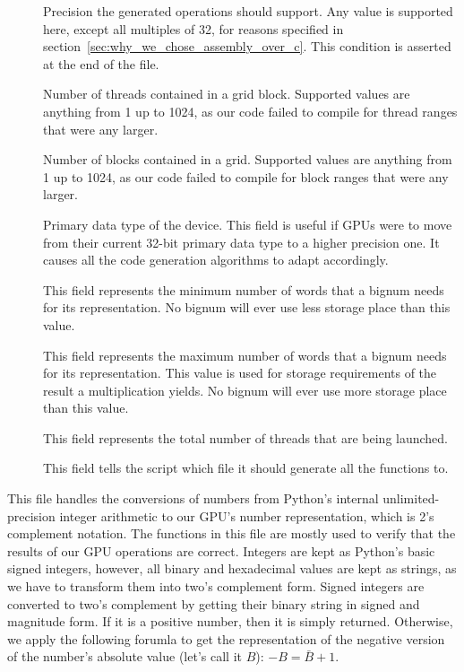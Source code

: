 \documentclass[10pt, a4paper]{report}
\begin{document}
\begin{description}
\begin{description}
\item[] Precision the generated operations should support.
Any value is supported here, except all multiples of 32, for reasons specified
in section~\ref{sec:why_we_chose_assembly_over_c}.
This condition is asserted at the end of the file.
\item[] Number of threads contained in a grid block.
Supported values are anything from 1 up to 1024, as our code failed to compile
for thread ranges that were any larger.
\item[] Number of blocks contained in a grid.
Supported values are anything from 1 up to 1024, as our code failed to compile
for block ranges that were any larger.
\item[] Primary data type of the device.
This field is useful if GPUs were to move from their current  32-bit primary
data type to a higher precision one.
It causes all the code generation algorithms to adapt accordingly.
\item[] This field represents the minimum number
of words that a bignum needs for its representation.
No bignum will ever use less storage place than this value.
\item[] This field represents the maximum number
of words that a bignum needs for its representation.
This value is used for storage requirements of the result a multiplication
yields.
No bignum will ever use more storage place than this value.
\item[] This field represents the total number of threads
that are being launched.
\item[] This field tells the script which file it
should generate all the functions to.
\end{description}

\item[\Q{conversions.py}]
This file handles the conversions of numbers from Python's internal
unlimited-precision integer arithmetic to our GPU's number representation, which
is 2's complement notation.
The functions in this file are mostly used to verify that the results of our GPU
operations are correct.
Integers are kept as Python's basic signed integers, however, all binary and
hexadecimal values are kept as strings, as we have to transform them into two's
complement form.
Signed integers are converted to two's complement by getting their binary string
in signed and magnitude form.
If it is a positive number, then it is simply returned.
Otherwise, we apply the following forumla to get the representation of the
negative version of the number's absolute value (let's call it $B$):
$-B = \bar{B} + 1$.


\end{description}
\end{document}
